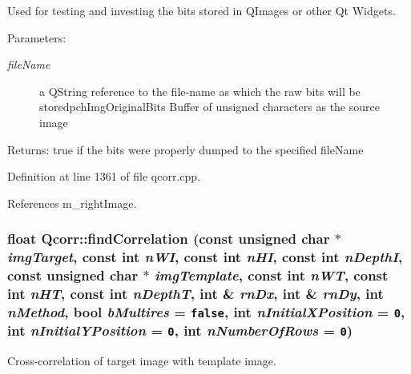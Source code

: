Used for testing and investing the bits stored in QImages or other Qt Widgets. 

\begin{Desc}
\item[Parameters:]
\begin{description}
\item[{\em fileName}]a QString reference to the file-name as which the raw bits will be storedpchImgOriginalBits Buffer of unsigned characters as the source image \end{description}
\end{Desc}
\begin{Desc}
\item[Returns:]true if the bits were properly dumped to the specified fileName \end{Desc}


Definition at line 1361 of file qcorr.cpp.

References m\_\-rightImage.\hypertarget{classQcorr_05dcc1b0be4596b355df235264180da4}{
\subsubsection[{findCorrelation}]{\setlength{\rightskip}{0pt plus 5cm}float Qcorr::findCorrelation (const unsigned char $\ast$ {\em imgTarget}, \/  const int {\em nWI}, \/  const int {\em nHI}, \/  const int {\em nDepthI}, \/  const unsigned char $\ast$ {\em imgTemplate}, \/  const int {\em nWT}, \/  const int {\em nHT}, \/  const int {\em nDepthT}, \/  int \& {\em rnDx}, \/  int \& {\em rnDy}, \/  int {\em nMethod}, \/  bool {\em bMultires} = {\tt false}, \/  int {\em nInitialXPosition} = {\tt 0}, \/  int {\em nInitialYPosition} = {\tt 0}, \/  int {\em nNumberOfRows} = {\tt 0})}}
\label{classQcorr_05dcc1b0be4596b355df235264180da4}


Cross-correlation of target image with template image. 

